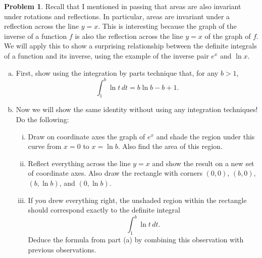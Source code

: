 \documentclass[11pt,oneside]{amsart}
\theoremstyle{definition}
\newtheorem{problem}{Problem}
\begin{document}
    \begin{problem}
        Recall that I mentioned in passing that areas are also invariant under rotations and reflections. In particular, areas are invariant under a reflection across the line $y=x$. This is interesting because the graph of the inverse of a function $f$ is also the reflection across the line $y=x$ of the graph of $f$. We will apply this to show a surprising relationship between the definite integrals of a function and its inverse, using the example of the inverse pair $e^x$ and $\ln x$.
        \begin{enumerate}[(a)]
            \item First, show using the integration by parts technique that, for any $b>1$,
            \[\int_1^b\ln t\,dt=b\ln b-b+1.\]
            \item Now we will show the same identity without using any integration techniques! Do the following:
            \begin{enumerate}[(i)]
                \item Draw on coordinate axes the graph of $e^x$ and shade the region under this curve from $x=0$ to $x=\ln b$. Also find the area of this region.
                \item Reflect everything across the line $y=x$ and show the result on a new set of coordinate axes. Also draw the rectangle with corners $(0,0)$, $(b,0)$, $(b,\ln b)$, and $(0,\ln b)$.
                \item If you drew everything right, the unshaded region within the rectangle should correspond exactly to the definite integral
                \[\int_1^b\ln t\,dt.\]
                Deduce the formula from part (a) by combining this observation with previous observations.
            \end{enumerate}
        \end{enumerate}
    \end{problem}
\end{document}
